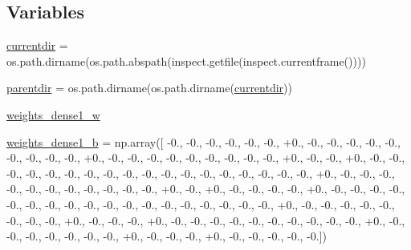 \subsection*{Variables}
\begin{DoxyCompactItemize}
\item 
\hyperlink{namespacepybullet-gym_1_1pybulletgym_1_1examples_1_1roboschool-weights_1_1enjoy___t_f___ant_py_bullet_env__v0__2017may_a1fd40aeb4c95f3c688eb22ad6e868663}{currentdir} = os.\+path.\+dirname(os.\+path.\+abspath(inspect.\+getfile(inspect.\+currentframe())))
\item 
\hyperlink{namespacepybullet-gym_1_1pybulletgym_1_1examples_1_1roboschool-weights_1_1enjoy___t_f___ant_py_bullet_env__v0__2017may_aca349d6d2cf22eed7668657ca96b90c6}{parentdir} = os.\+path.\+dirname(os.\+path.\+dirname(\hyperlink{namespacepybullet-gym_1_1pybulletgym_1_1examples_1_1roboschool-weights_1_1enjoy___t_f___ant_py_bullet_env__v0__2017may_a1fd40aeb4c95f3c688eb22ad6e868663}{currentdir}))
\item 
\hyperlink{namespacepybullet-gym_1_1pybulletgym_1_1examples_1_1roboschool-weights_1_1enjoy___t_f___ant_py_bullet_env__v0__2017may_ae01ad0dc9068d109f155b0671a58eb16}{weights\+\_\+dense1\+\_\+w}
\item 
\hyperlink{namespacepybullet-gym_1_1pybulletgym_1_1examples_1_1roboschool-weights_1_1enjoy___t_f___ant_py_bullet_env__v0__2017may_a4f7f9eceee778243137041427cadaa48}{weights\+\_\+dense1\+\_\+b} = np.\+array(\mbox{[} -\/0., -\/0., -\/0., -\/0., -\/0., -\/0., +0., -\/0., -\/0., -\/0., -\/0., -\/0., -\/0., -\/0., -\/0., -\/0., +0., -\/0., -\/0., -\/0., -\/0., -\/0., -\/0., -\/0., -\/0., -\/0., +0., -\/0., -\/0., +0., -\/0., -\/0., -\/0., -\/0., -\/0., -\/0., -\/0., -\/0., -\/0., -\/0., -\/0., -\/0., -\/0., -\/0., -\/0., -\/0., -\/0., -\/0., +0., -\/0., -\/0., -\/0., -\/0., -\/0., -\/0., -\/0., -\/0., -\/0., -\/0., -\/0., +0., -\/0., +0., -\/0., -\/0., -\/0., -\/0., +0., -\/0., -\/0., -\/0., -\/0., -\/0., -\/0., -\/0., -\/0., -\/0., -\/0., -\/0., -\/0., -\/0., -\/0., -\/0., -\/0., -\/0., -\/0., +0., -\/0., -\/0., -\/0., -\/0., -\/0., -\/0., -\/0., -\/0., +0., -\/0., -\/0., -\/0., +0., -\/0., -\/0., -\/0., -\/0., -\/0., -\/0., -\/0., -\/0., -\/0., -\/0., +0., -\/0., -\/0., -\/0., -\/0., -\/0., -\/0., -\/0., +0., -\/0., -\/0., -\/0., +0., -\/0., -\/0., -\/0., -\/0., -\/0.\mbox{]})

\end{DoxyCompactItemize}
